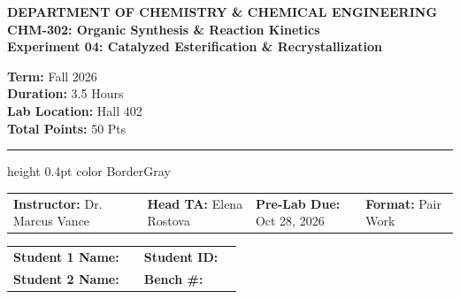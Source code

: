 \documentclass[10pt,a4paper]{article}
\begin{document}
\begin{tcolorbox}[
  enhanced,
  colback=TealLight,
  colframe=TealPrimary,
  boxrule=1.2pt,
  arc=5pt,
  left=10pt, right=10pt, top=8pt, bottom=8pt
]
  \begin{minipage}[c]{0.72\textwidth}
    {\color{TealPrimary}\scriptsize\bfseries\faFlask \quad DEPARTMENT OF CHEMISTRY \& CHEMICAL ENGINEERING}\\[2pt]
    {\color{NavyDark}\Large\bfseries CHM-302: Organic Synthesis \& Reaction Kinetics}\\[3pt]
    {\color{SlateGray}\normalsize\bfseries Experiment 04: Catalyzed Esterification \& Recrystallization}
  \end{minipage}%
  \hfill
  \begin{minipage}[c]{0.25\textwidth}
    \begin{tcolorbox}[
      colback=white,
      colframe=TealPrimary!40,
      boxrule=0.6pt,
      arc=3pt,
      left=4pt, right=4pt, top=3pt, bottom=3pt,
      halign=center
    ]
      \scriptsize\color{NavyDark}
      \textbf{Term:} Fall 2026\\
      \textbf{Duration:} 3.5 Hours\\
      \textbf{Lab Location:} Hall 402\\
      \textbf{Total Points:} 50 Pts
    \end{tcolorbox}
  \end{minipage}

  \vspace{5pt}
  \hrule height 0.4pt color BorderGray
  \vspace{5pt}

  \begin{tabularx}{\textwidth}{@{}X X X X@{}}
    \scriptsize\textbf{Instructor:} Dr. Marcus Vance & 
    \scriptsize\textbf{Head TA:} Elena Rostova & 
    \scriptsize\textbf{Pre-Lab Due:} Oct 28, 2026 & 
    \scriptsize\textbf{Format:} Pair Work
  \end{tabularx}
\end{tcolorbox}

\vspace{0.1cm}

\begin{tcolorbox}[
  enhanced,
  colback=LightGray,
  colframe=BorderGray,
  boxrule=0.6pt,
  arc=3pt,
  left=8pt, right=8pt, top=5pt, bottom=5pt
]
  \scriptsize
  \begin{tabularx}{\textwidth}{@{}l X l X@{}}
    \textbf{Student 1 Name:} & \hrulefill & \textbf{Student ID:} & \hrulefill \\[4pt]
    \textbf{Student 2 Name:} & \hrulefill & \textbf{Bench \#:} & \hrulefill
  \end{tabularx}
\end{tcolorbox}
\end{document}
